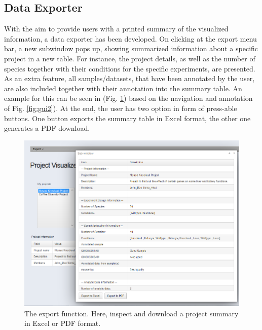 \documentclass[a4paper, 11pt]{article}
\begin{document}
\subsection{Data Exporter}
With the aim to provide users with a printed summary of the visualized information, a data exporter has been developed. On clicking at the export menu bar, a new subwindow pops up, showing summarized information about a specific project in a new table. For instance, the project details, as well as the number of species together with their conditions for the specific experiments, are presented. As an extra feature, all samples/datasets, that have been annotated by the user, are also included together with their annotation into the summary table. An example for this can be seen in (Fig. \ref{fig:gui4}) based on the navigation and annotation of Fig. \ref{fig:gui2}). At the end, the user has two option in form of press-able buttons. One button exports the summary table in Excel format, the other one generates a PDF download.
\begin{figure}[H]
\centering
\includegraphics[scale=0.40]{GUI_4.png}
\caption[The export function]{The export function. Here, inspect and download a project summary in Excel or PDF format.}
\label{fig:gui4}
\end{figure}
\noindent 
\end{document}
